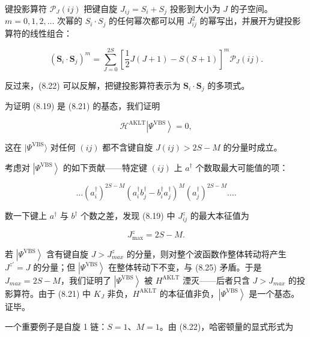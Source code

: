 键投影算符 $\mathcal{P}_{J}(ij)$ 把键自旋 $J_{ij} = S_{i} + S_{j}$ 投影到大小为 $J$ 的子空间。$m = 0, 1, 2, \ldots$ 次幂的 $S_{i} \cdot S_{j}$ 的任何幂次都可以用 $J_{ij}^{2}$ 的幂写出，并展开为键投影算符的线性组合：

\begin{equation*}
\left( \mathbf {S} _ {i} \cdot \mathbf {S} _ {j} \right) ^ {m} = \sum_ {J = 0} ^ {2 S} \left[ \frac {1}{2} J ( J + 1 ) - S ( S + 1 ) \right] ^ {m} \mathcal {P} _ {J} ( ij ).
\tag{8.22}
\end{equation*}

反过来，(8.22) 可以反解，把键投影算符表示为 $\mathbf{S}_i\cdot \mathbf{S}_j$ 的多项式。

为证明 (8.19) 是 (8.21) 的基态，我们证明

\begin{equation*}
\mathcal {H} ^ {\mathrm{AKLT}} \left| \Psi^ {\mathrm{VBS}} \right\rangle = 0 ,
\tag{8.23}
\end{equation*}

这在 $|\Psi^{\mathrm{VBS}}\rangle$ 对任何 $(ij)$ 都不含键自旋 $J(ij) > 2S - M$ 的分量时成立。

考虑对 $\left|\Psi^{\mathrm{VBS}}\right\rangle$ 的如下贡献——特定键 $(ij)$ 上 $a^{\dagger}$ 个数取最大可能值的项：

\begin{equation*}
\dots \left( a _ {i} ^ {\dagger} \right) ^ {2S - M} \left( a _ {i} ^ {\dagger} b _ {j} ^ {\dagger} - b _ {i} ^ {\dagger} a _ {j} ^ {\dagger} \right) ^ {M} \left( a _ {j} ^ {\dagger} \right) ^ {2S - M} \dots .
\tag{8.24}
\end{equation*}

数一下键上 $a^{\dagger}$ 与 $b^{\dagger}$ 个数之差，发现 (8.19) 中 $J_{ij}^{z}$ 的最大本征值为

\begin{equation*}
J _ {\mathrm{max}} ^ {z} = 2 S - M.
\tag{8.25}
\end{equation*}

若 $\left|\Psi^{\mathrm{VBS}}\right\rangle$ 含有键自旋 $J > J_{max}^{z}$ 的分量，则对整个波函数作整体转动将产生 $J^{z'} = J$ 的分量；但 $\left|\Psi^{\mathrm{VBS}}\right\rangle$ 在整体转动下不变，与 (8.25) 矛盾。于是 $J_{max} = 2S - M$，我们证明了 $\left|\Psi^{\mathrm{VBS}}\right\rangle$ 被 $H^{\mathrm{AKLT}}$ 湮灭——后者只含 $J > J_{max}$ 的投影算符。由于 (8.21) 中 $K_{J}$ 非负，$H^{\mathrm{AKLT}}$ 的本征值非负，$\left|\Psi^{\mathrm{VBS}}\right\rangle$ 是一个基态。证毕。

一个重要例子是自旋 1 链：$S = 1$、$M = 1$。由 (8.22)，哈密顿量的显式形式为

